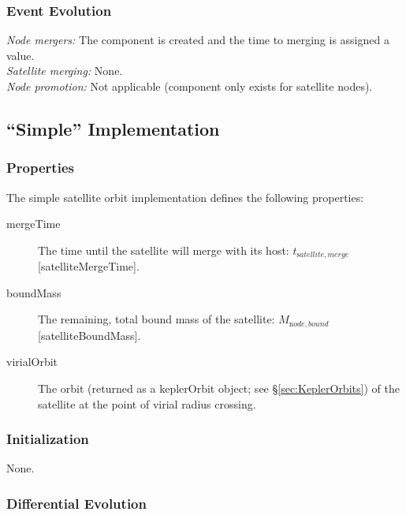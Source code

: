 \subsubsection{Event Evolution}

\noindent\emph{Node mergers:} The \gls{component} is created and the time to merging is assigned a value.\\

\noindent\emph{Satellite merging:} None.\\

\noindent\emph{Node promotion:} Not applicable (component only exists for satellite nodes).\\

\subsection{``Simple'' Implementation}\label{sec:SatelliteOrbitComponentSimple}

\subsubsection{Properties}

The simple satellite orbit implementation defines the following properties:
\begin{description}
 \item [{\normalfont \ttfamily mergeTime}] The time until the satellite will merge with its host: $t_{\mathrm satellite, merge}$ [{\normalfont \ttfamily satelliteMergeTime}].
 \item [{\normalfont \ttfamily boundMass}] The remaining, total bound mass of the satellite: $M_{\mathrm node,bound}$ [{\normalfont \ttfamily satelliteBoundMass}].
 \item[{\normalfont \ttfamily virialOrbit}] The orbit (returned as a {\normalfont \ttfamily keplerOrbit} object; see \S\ref{sec:KeplerOrbits}) of the satellite at the point of virial radius crossing.
\end{description}

\subsubsection{Initialization}

None.

\subsubsection{Differential Evolution}

